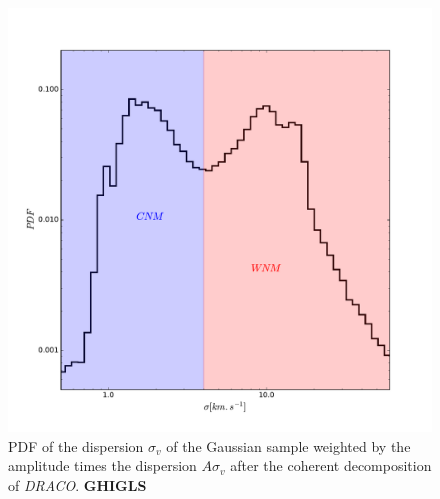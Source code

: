 \documentclass[traditabstract]{aa}
\begin{document}
\begin{figure}
  \includegraphics[width=\linewidth]{Figures/PDF_sigma_over_A.pdf}
  \caption{\label{PDF_sigma} PDF of the dispersion $\sigma_v$ of the Gaussian sample weighted by the amplitude times the dispersion $A\sigma_v$ after the coherent decomposition of \textit{DRACO}. \textbf{GHIGLS}}
\end{figure}

\end{document}
